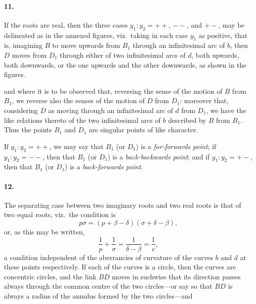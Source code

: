 \documentclass[11pt,a4paper]{article}
\theoremstyle{plain}
\begin{document}
\paragraph{11.} If the roots are real, then the three cases $y_1 : y_2 = ++$, $--$, and $+-$, may be delineated as in the annexed figures, viz.~taking in each case $y_1$ as positive, that is, imagining $B$ to move upwards from $B_1$ through an infinitesimal arc of $b$, then $D$ moves from $D_1$ through either of two infinitesimal arcs of $d$, both upwards, both downwards, or the one upwards and the other downwards, as shown in the figures.

\begin{center}
\end{center}

and where it is to be observed that, reversing the sense of the motion of $B$ from $B_1$, we reverse also the senses of the motion of $D$ from $D_1$: moreover that, considering $D$ as moving through an infinitesimal arc of $d$ from $D_1$, we have the like relations thereto of the two infinitesimal arcs of $b$ described by $B$ from $B_1$. Thus the points $B_1$ and $D_1$ are singular points of like character.

If $y_1 : y_2 = ++$, we may say that $B_1$ (or $D_1$) is a \textit{for-forwards point}; if $y_1 : y_2 = --$, then that $B_1$ (or $D_1$) is a \textit{back-backwards point}; and if $y_1 : y_2 = +-$, then that $B_1$ (or $D_1$) is a \textit{back-forwards point}.

\paragraph{12.} The separating case between two imaginary roots and two real roots is that of two equal roots, viz.~the condition is
\[
p\sigma = (p + \beta - \delta)(\sigma + \delta - \beta),
\]
or, as this may be written,
\[
\frac{1}{p} + \frac{1}{\sigma} = \frac{1}{\delta - \beta} = \frac{1}{c},
\]
a condition independent of the aberrancies of curvature of the curves $b$ and $d$ at these points respectively. If each of the curves is a circle, then the curves are concentric circles, and the link $BD$ moves in suchwise that its direction passes always through the common centre of the two circles---or say so that $BD$ is always a radius of the annulus formed by the two circles---and
\end{document}
